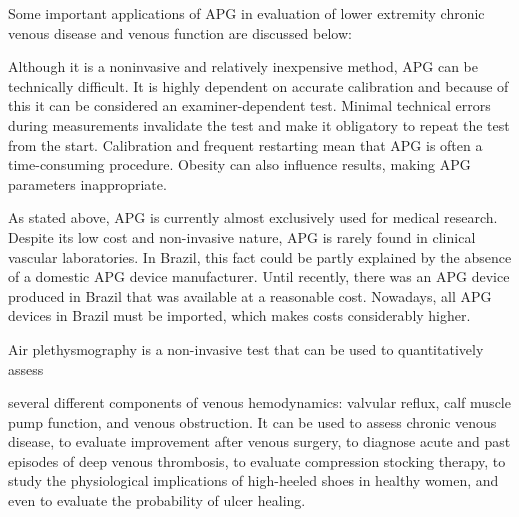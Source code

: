 \documentclass[numberinsection,times,10pt,spreadimages]{memoir}
\begin{document}
\begin{multicols}{2}

Some important applications of APG in evaluation of lower extremity chronic
venous
disease and venous function are discussed below:


Although it is a noninvasive and relatively inexpensive method, APG can be
technically difficult. It is highly dependent on accurate calibration and
because of
this it can be considered an examiner-dependent test. Minimal technical errors
during measurements invalidate the test and make it obligatory to repeat the
test
from the start. Calibration and frequent restarting mean that APG is often a
time-consuming procedure. Obesity can also influence results, making APG
parameters
inappropriate.

As stated above, APG is currently almost exclusively used for medical research.
Despite its low cost and non-invasive nature, APG is rarely found in clinical
vascular laboratories. In Brazil, this fact could be partly explained by the
absence
of a domestic APG device manufacturer. Until recently, there was an APG device
produced in Brazil that was available at a reasonable cost. Nowadays, all APG
devices in Brazil must be imported, which makes costs considerably higher.


Air plethysmography is a non-invasive test that can be used to quantitatively
assess

several different components of venous hemodynamics: valvular reflux, calf
muscle
pump function, and venous obstruction. It can be used to assess chronic venous
disease, to evaluate improvement after venous surgery, to diagnose acute and
past
episodes of deep venous thrombosis, to evaluate compression stocking therapy, to
study the physiological implications of high-heeled shoes in healthy women, and
even
to evaluate the probability of ulcer healing.

\end{multicols}
\end{document}

